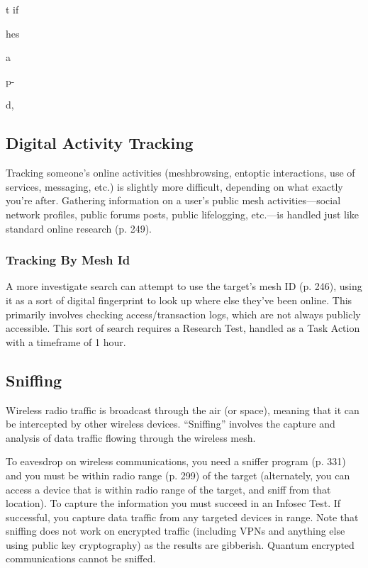 t if 

hes

a 

p-

d, 

\subsection{Digital Activity Tracking}

Tracking someone's online activities (meshbrowsing, 
entoptic interactions, use of services, messaging, etc.) 
is slightly more difficult, depending on what exactly 
you're after. Gathering information on a user's public 
mesh activities—social network profiles, public 
forums posts, public lifelogging, etc.—is handled just 
like standard online research (p. 249).

\subsubsection{Tracking By Mesh Id}

A more investigate search can attempt to use the 
target's mesh ID (p. 246), using it as a sort of digital 
fingerprint to look up where else they've been online. 
This primarily involves checking access/transaction 
logs, which are not always publicly accessible. This 
sort of search requires a Research Test, handled as a 
Task Action with a timeframe of 1 hour.

\subsection{Sniffing}

Wireless radio traffic is broadcast through the air (or 
space), meaning that it can be intercepted by other wireless
devices. ``Sniffing'' involves the capture and analysis
of data traffic flowing through the wireless mesh.

To eavesdrop on wireless communications, you need 
a sniffer program (p. 331) and you must be within 
radio range (p. 299) of the target (alternately, you can 
access a device that is within radio range of the target, 
and sniff from that location). To capture the information
you must succeed in an Infosec Test. If successful,
you capture data traffic from any targeted devices in 
range. Note that sniffing does not work on encrypted 
traffic (including VPNs and anything else using public 
key cryptography) as the results are gibberish. Quantum
encrypted communications cannot be sniffed.


